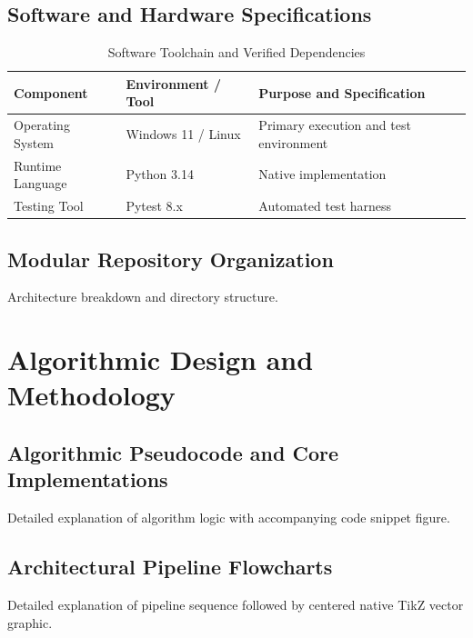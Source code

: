 \documentclass[12pt,a4paper]{report}
\begin{document}
\section{Software and Hardware Specifications}

\begin{table}[h!]
\centering
\fontsize{10}{13}\selectfont
\begin{tabular}{|l|l|p{3.2in}|}
\hline
\rowcolor{tableheader}
\textbf{Component} & \textbf{Environment / Tool} & \textbf{Purpose and Specification} \\
\hline
Operating System & Windows 11 / Linux & Primary execution and test environment \\
Runtime Language & Python 3.14 & Native implementation \\
Testing Tool & Pytest 8.x & Automated test harness \\
\hline
\end{tabular}
\caption{Software Toolchain and Verified Dependencies}
\end{table}

\section{Modular Repository Organization}
Architecture breakdown and directory structure.

\newpage

\chapter{Algorithmic Design and Methodology}

\section{Algorithmic Pseudocode and Core Implementations}
Detailed explanation of algorithm logic with accompanying code snippet figure.

\newpage

\section{Architectural Pipeline Flowcharts}
Detailed explanation of pipeline sequence followed by centered native TikZ vector graphic.
\end{document}
